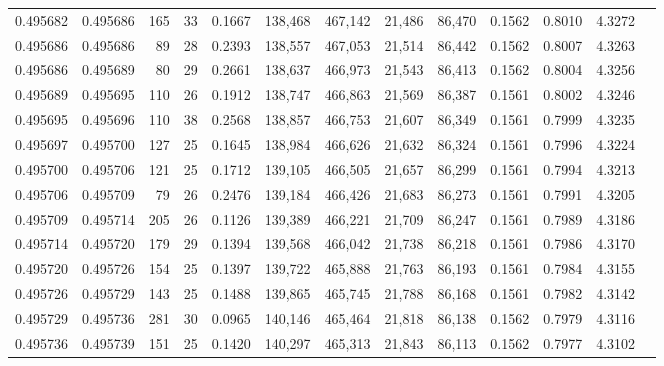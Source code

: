 \begin{tabular}{rrrrrrrrrrrrr}
0.495682 & 0.495686 & 165 &  33 &                                     0.1667 & 138,468 & 467,142 &  21,486 &  86,470 & 0.1562 & 0.8010 & 4.3272 \\
0.495686 & 0.495686 &  89 &  28 &                                     0.2393 & 138,557 & 467,053 &  21,514 &  86,442 & 0.1562 & 0.8007 & 4.3263 \\
0.495686 & 0.495689 &  80 &  29 &                                     0.2661 & 138,637 & 466,973 &  21,543 &  86,413 & 0.1562 & 0.8004 & 4.3256 \\
0.495689 & 0.495695 & 110 &  26 &                                     0.1912 & 138,747 & 466,863 &  21,569 &  86,387 & 0.1561 & 0.8002 & 4.3246 \\
0.495695 & 0.495696 & 110 &  38 &                                     0.2568 & 138,857 & 466,753 &  21,607 &  86,349 & 0.1561 & 0.7999 & 4.3235 \\
0.495697 & 0.495700 & 127 &  25 &                                     0.1645 & 138,984 & 466,626 &  21,632 &  86,324 & 0.1561 & 0.7996 & 4.3224 \\
0.495700 & 0.495706 & 121 &  25 &                                     0.1712 & 139,105 & 466,505 &  21,657 &  86,299 & 0.1561 & 0.7994 & 4.3213 \\
0.495706 & 0.495709 &  79 &  26 &                                     0.2476 & 139,184 & 466,426 &  21,683 &  86,273 & 0.1561 & 0.7991 & 4.3205 \\
0.495709 & 0.495714 & 205 &  26 &                                     0.1126 & 139,389 & 466,221 &  21,709 &  86,247 & 0.1561 & 0.7989 & 4.3186 \\
0.495714 & 0.495720 & 179 &  29 &                                     0.1394 & 139,568 & 466,042 &  21,738 &  86,218 & 0.1561 & 0.7986 & 4.3170 \\
0.495720 & 0.495726 & 154 &  25 &                                     0.1397 & 139,722 & 465,888 &  21,763 &  86,193 & 0.1561 & 0.7984 & 4.3155 \\
0.495726 & 0.495729 & 143 &  25 &                                     0.1488 & 139,865 & 465,745 &  21,788 &  86,168 & 0.1561 & 0.7982 & 4.3142 \\
0.495729 & 0.495736 & 281 &  30 &                                     0.0965 & 140,146 & 465,464 &  21,818 &  86,138 & 0.1562 & 0.7979 & 4.3116 \\
0.495736 & 0.495739 & 151 &  25 &                                     0.1420 & 140,297 & 465,313 &  21,843 &  86,113 & 0.1562 & 0.7977 & 4.3102 \\

\end{tabular}
